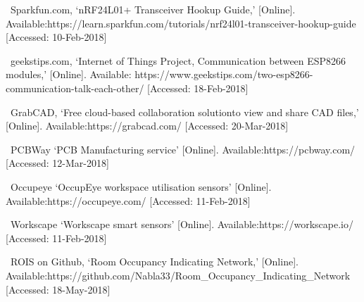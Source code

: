 \documentclass[journal]{IEEEtran}
\begin{document}
%
%
%
\begin{thebibliography}{1}

~Sparkfun.com, `nRF24L01+ Transceiver Hookup Guide,' [Online].
Available:https://learn.sparkfun.com/tutorials/nrf24l01-transceiver-hookup-guide 
[Accessed: 10-Feb-2018]

~geekstips.com, `Internet of Things Project, Communication between ESP8266 modules,' [Online]. Available: https://www.geekstips.com/two-esp8266-communication-talk-each-other/ [Accessed: 18-Feb-2018] 

~GrabCAD, `Free cloud-based collaboration solutionto view and share CAD files,' [Online].
Available:https://grabcad.com/ [Accessed: 20-Mar-2018]

~PCBWay `PCB Manufacturing service'  [Online].
Available:https://pcbway.com/ [Accessed: 12-Mar-2018]

~Occupeye `OccupEye workspace utilisation sensors'  [Online].
Available:https://occupeye.com/ [Accessed: 11-Feb-2018]

~Workscape `Workscape smart sensors'  [Online].
Available:https://workscape.io/ [Accessed: 11-Feb-2018]

~ROIS on Github, `Room Occupancy Indicating Network,'  [Online].
Available:https://github.com/Nabla33/Room\_Occupancy\_Indicating\_Network [Accessed: 18-May-2018]


\end{thebibliography}
\end{document}
